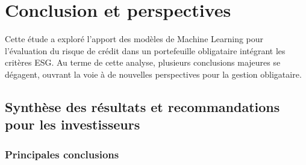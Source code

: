 \chapter*{Conclusion et perspectives}

Cette étude a exploré l'apport des modèles de Machine Learning pour l'évaluation du risque de crédit dans un portefeuille obligataire intégrant les critères ESG. Au terme de cette analyse, plusieurs conclusions majeures se dégagent, ouvrant la voie à de nouvelles perspectives pour la gestion obligataire.

\section*{Synthèse des résultats et recommandations pour les investisseurs}

\subsection*{Principales conclusions}

